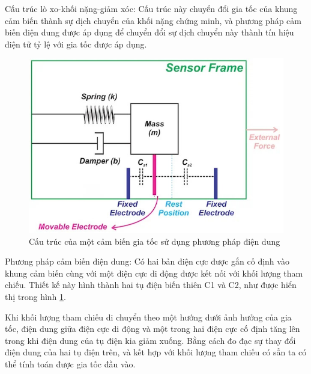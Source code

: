 \indent Cấu trúc lò xo-khối nặng-giảm xóc: Cấu trúc này chuyển đổi gia tốc của khung cảm biến thành sự dịch chuyển của khối nặng chứng minh, và phương pháp cảm biến điện dung được áp dụng để chuyển đổi sự dịch chuyển này thành tín hiệu điện tử tỷ lệ với gia tốc được áp dụng.
\begin{figure}[H]
    \centering
    \includegraphics[width=\textwidth,height=\textheight,keepaspectratio]{Images/Theoretical basis/168_Introduction_to_Capacitive_Acceleration_Sensors_Figure_3.jpeg}
    \caption{Cấu trúc của một cảm biến gia tốc sử dụng phương pháp điện dung}
    \label{fig:capacitive_sensor}
\end{figure}
\indent Phương pháp cảm biến điện dung: Có hai bản điện cực được gắn cố định vào khung cảm biến cùng với một điện cực di động được kết nối với khối lượng tham chiếu. Thiết kế này hình thành hai tụ điện biến thiên C1 và C2, như được hiển thị trong hình \ref{fig:capacitive_sensor}.

\indent Khi khối lượng tham chiếu di chuyển theo một hướng dưới ảnh hưởng của gia tốc, điện dung giữa điện cực di động và một trong hai điện cực cố định tăng lên trong khi điện dung của tụ điện kia giảm xuống. Bằng cách đo đạc sự thay đổi điện dung của hai tụ điện trên, và kết hợp với khối lượng tham chiếu có sẳn ta có thể tính toán được gia tốc đầu vào.

